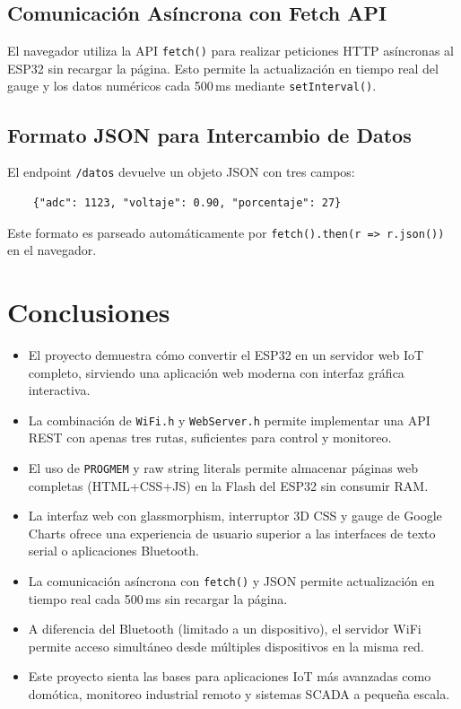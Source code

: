 \documentclass[12pt,a4paper]{article}
\begin{document}
\subsection{Comunicación Asíncrona con Fetch API}

El navegador utiliza la API \texttt{fetch()} para realizar peticiones HTTP asíncronas al ESP32 sin recargar la página. Esto permite la actualización en tiempo real del gauge y los datos numéricos cada 500\,ms mediante \texttt{setInterval()}.

\subsection{Formato JSON para Intercambio de Datos}

El endpoint \texttt{/datos} devuelve un objeto JSON con tres campos:
\begin{verbatim}
    {"adc": 1123, "voltaje": 0.90, "porcentaje": 27}
\end{verbatim}

Este formato es parseado automáticamente por \texttt{fetch().then(r => r.json())} en el navegador.

\section{Conclusiones}

\begin{itemize}
    \item El proyecto demuestra cómo convertir el ESP32 en un servidor web IoT completo, sirviendo una aplicación web moderna con interfaz gráfica interactiva.
    \item La combinación de \texttt{WiFi.h} y \texttt{WebServer.h} permite implementar una API REST con apenas tres rutas, suficientes para control y monitoreo.
    \item El uso de \texttt{PROGMEM} y raw string literals permite almacenar páginas web completas (HTML+CSS+JS) en la Flash del ESP32 sin consumir RAM.
    \item La interfaz web con glassmorphism, interruptor 3D CSS y gauge de Google Charts ofrece una experiencia de usuario superior a las interfaces de texto serial o aplicaciones Bluetooth.
    \item La comunicación asíncrona con \texttt{fetch()} y JSON permite actualización en tiempo real cada 500\,ms sin recargar la página.
    \item A diferencia del Bluetooth (limitado a un dispositivo), el servidor WiFi permite acceso simultáneo desde múltiples dispositivos en la misma red.
    \item Este proyecto sienta las bases para aplicaciones IoT más avanzadas como domótica, monitoreo industrial remoto y sistemas SCADA a pequeña escala.
\end{itemize}
\end{document}

